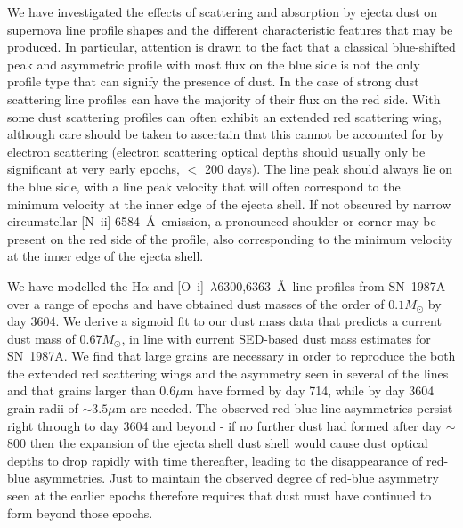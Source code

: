 \documentclass[useAMS,usenatbib,usegraphicx]{mnras}
\begin{document}
We have investigated the effects of scattering and absorption by ejecta 
dust on supernova line profile shapes and the different characteristic 
features that may be produced.  In particular, attention is drawn to the 
fact that a classical blue-shifted peak and asymmetric profile with most 
flux on the blue side is not the only profile type that can signify the 
presence of dust. In the case of strong dust scattering line profiles 
can have the majority of their flux on the red side. With some dust 
scattering profiles can often exhibit an extended red scattering wing, 
although care should be taken to ascertain that this cannot be accounted 
for by electron scattering (electron scattering optical depths should 
usually only be significant at very early epochs, $<$ 200 days). The line 
peak should always lie on the blue side, with a line peak velocity that 
will often correspond to the minimum velocity at the inner edge of the 
ejecta shell. If not obscured by narrow circumstellar [N~{\sc ii}] 
6584~\AA\ emission, a pronounced shoulder or corner may be present on the 
red side of the profile, also corresponding to the minimum velocity at the 
inner edge of the ejecta shell.

We have modelled the H$\alpha$ and [O~{\sc i}]~$\lambda$6300,6363~\AA\ 
line profiles from SN~1987A over a range of epochs and have obtained dust 
masses of the order of $0.1M_{\odot}$ by day 3604.  We derive a sigmoid 
fit to our dust mass data that predicts a current dust mass of 
0.67$M_{\odot}$, in line with current SED-based dust mass estimates for 
SN~1987A.  We find that large grains are necessary in order to reproduce 
the both the extended red scattering wings and the asymmetry seen in 
several of the lines and that grains larger than $0.6\mu$m have formed by 
day 714, while by day 3604 grain radii of $\sim 3.5\mu$m are needed. The 
observed red-blue line asymmetries persist right through to day 3604 and 
beyond - if no further dust had formed after day $\sim$800 then the 
expansion of the ejecta shell dust shell would cause dust
optical depths to drop rapidly with time thereafter, leading to 
the disappearance of red-blue asymmetries. Just to maintain the observed 
degree of red-blue asymmetry seen at the earlier epochs therefore 
requires that dust must have continued to form beyond those epochs.


%
%
\end{document}
